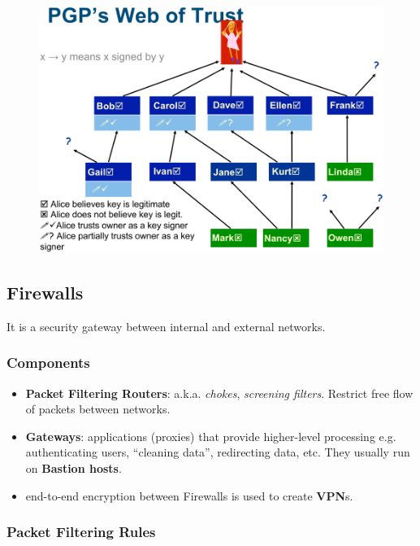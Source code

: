 \documentclass[twocolumn,landscape,10pt]{article}
\theoremstyle{definition}
\begin{document}
\begin{figure}[h]
  	\includegraphics[scale=0.27]{pgp.png}
  	\centering
\end{figure}

\subsection{Firewalls}

It is a security gateway between internal and external networks.

\subsubsection{Components}
\begin{itemize}
    \item \textbf{Packet Filtering Routers}: a.k.a. \emph{chokes},
        \emph{screening filters}. Restrict free flow of packets
        between networks.
    \item \textbf{Gateways}: applications (proxies) that provide higher-level
        processing e.g. authenticating users, ``cleaning data'', redirecting
        data, etc. They usually run on \textbf{Bastion hosts}.
    \item end-to-end encryption between Firewalls is used to create
        \textbf{VPN}s.
\end{itemize} 

\subsubsection{Packet Filtering Rules}
\end{document}
